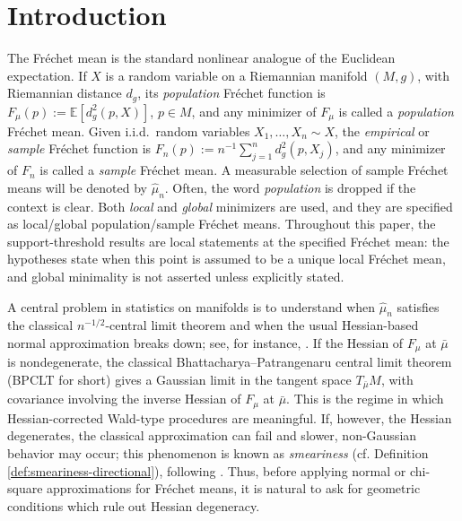 \documentclass{amsart}
\theoremstyle{definition}
\theoremstyle{remark}
\newcommand{\mubar}{\bar{\mu}}
\newcommand\0{\boldsymbol{0}}
\begin{document}
\section{Introduction}\label{scn:introduction}

The Fr\'echet mean is the standard nonlinear analogue of the Euclidean expectation.  If \(X\) is a random variable on a Riemannian manifold \((M,g)\), with Riemannian distance \(d_g\), its \textit{population} Fr\'echet function is \(F_\mu(p):=\mathbb E[d_g^2(p,X)]\), \(p\in M\), and any minimizer of \(F_\mu\) is called a \textit{population} Fr\'echet mean.  Given i.i.d.\ random variables \(X_1,\ldots,X_n\sim X\), the\textit{ empirical} or \textit{sample} Fr\'echet function is \(F_n(p):=n^{-1}\sum_{j=1}^n d_g^2(p,X_j)\), and any minimizer of \(F_n\) is called a \textit{sample} Fr\'echet mean.  A measurable selection of sample Fr\'echet means will be denoted by \(\hat\mu_n\). Often, the word \textit{population} is dropped if the context is clear. Both \textit{local} and \textit{global} minimizers are used, and they are specified as local/global population/sample Fr\'echet means. Throughout this paper, the support-threshold results are local statements at the specified Fr\'echet mean: the hypotheses state when this point is assumed to be a unique local Fr\'echet mean, and global minimality is not asserted unless explicitly stated.

A central problem in statistics on manifolds is to understand when \(\hat\mu_n\) satisfies the classical \(n^{-1/2}\)-central limit theorem and when the usual Hessian-based normal approximation breaks down; see, for instance, \citet{BP,BP2,BL,HH,H_Procrustes_10}.  If the Hessian of $F_\mu$ at $\mubar$ is nondegenerate, the classical Bhattacharya--Patrangenaru central limit theorem (BPCLT for short) gives a Gaussian limit in the tangent space \(T_{\mubar}M\), with covariance involving the inverse Hessian of \(F_\mu\) at \(\mubar\).  This is the regime in which Hessian-corrected Wald-type procedures are meaningful.  If, however, the Hessian degenerates, the classical approximation can fail and slower, non-Gaussian behavior may occur; this phenomenon is known as\textit{ smeariness} (cf. Definition \ref{def:smeariness-directional}), following \citet{HotzHuckemann2015,HE}.  Thus, before applying normal or chi-square approximations for Fr\'echet means, it is natural to ask for geometric conditions which rule out Hessian degeneracy.
\end{document}
